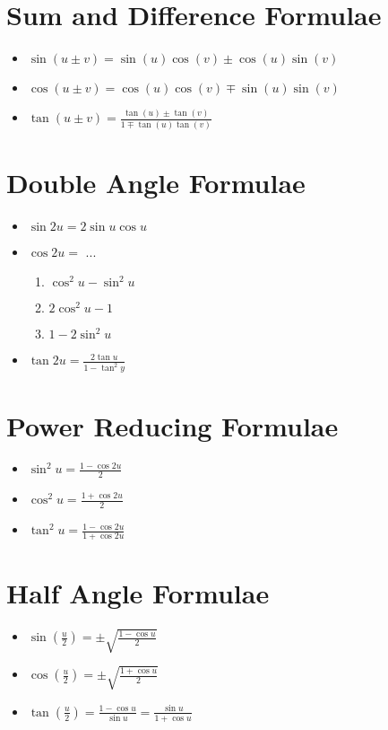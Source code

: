 \section{Sum and Difference Formulae}
\begin{itemize}
  \item{$\sin(u \pm v)=\sin(u)\cos(v) \pm \cos(u)\sin(v)$}
  \item{$\cos(u \pm v)=\cos(u)\cos(v) \mp \sin(u)\sin(v)$}
  \item{$\tan(u \pm v)=\frac{\tan(u) \pm \tan(v)}{1 \mp \tan(u)\tan(v)}$}
\end{itemize}

\section{Double Angle Formulae}
\begin{itemize}
  \item{$\sin2u=2\sin u\cos u$}
  \item{$\cos2u=$ ...}
    \begin{enumerate}
      \item{$\cos^2u-\sin^2u$}
      \item{$2\cos^2u-1$}
      \item{$1-2\sin^2u$}
    \end{enumerate}
  \item{$\tan2u=\frac{2\tan u}{1-\tan^2y}$}
\end{itemize}

\section{Power Reducing Formulae}
\begin{itemize}
  \item{$\sin^2u=\frac{1-\cos 2u}{2}$}
  \item{$\cos^2u=\frac{1+\cos 2u}{2}$}
  \item{$\tan^2u=\frac{1-\cos 2u}{1+\cos 2u}$}
\end{itemize}

\section{Half Angle Formulae}
\begin{itemize}
  \item{$\sin(\frac{u}{2})=\pm\sqrt{\frac{1-\cos u}{2}}$}
  \item{$\cos(\frac{u}{2})=\pm\sqrt{\frac{1+\cos u}{2}}$}
  \item{$\tan(\frac{u}{2})=\frac{1-\cos u}{\sin u}=\frac{\sin u}{1+\cos u}$}
\end{itemize}

